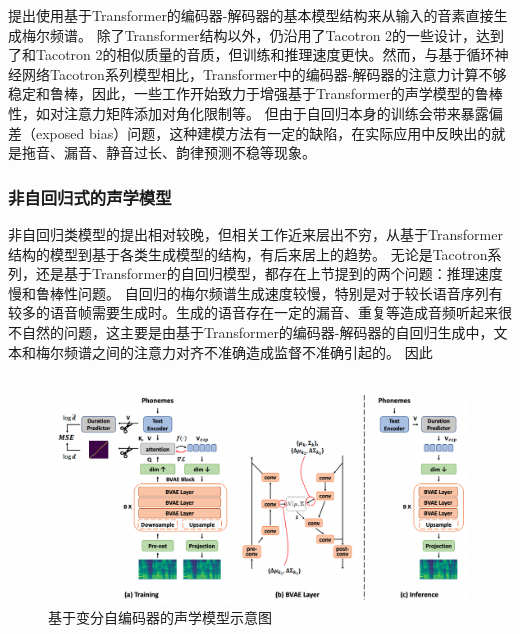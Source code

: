 \citet{transformertts}提出使用基于Transformer的编码器-解码器的基本模型结构来从输入的音素直接生成梅尔频谱。
\citet{transformertts}除了Transformer结构以外，仍沿用了Tacotron 2的一些设计，达到了和Tacotron 2的相似质量的音质，但训练和推理速度更快。然而，与基于循环神经网络Tacotron系列模型相比，Transformer中的编码器-解码器的注意力计算不够稳定和鲁棒，因此，一些工作开始致力于增强基于Transformer的声学模型的鲁棒性，如对注意力矩阵添加对角化限制\citep{robutrans}等。
但由于自回归本身的训练会带来暴露偏差（exposed bias）问题，这种建模方法有一定的缺陷，在实际应用中反映出的就是拖音、漏音、静音过长、韵律预测不稳等现象。
\subsubsection{非自回归式的声学模型}
非自回归类模型的提出相对较晚，但相关工作近来层出不穷，从基于Transformer结构的模型到基于各类生成模型的结构，有后来居上的趋势。
无论是Tacotron系列，还是基于Transformer的自回归模型，都存在上节提到的两个问题：推理速度慢和鲁棒性问题。
自回归的梅尔频谱生成速度较慢，特别是对于较长语音序列有较多的语音帧需要生成时。生成的语音存在一定的漏音、重复等造成音频听起来很不自然的问题，这主要是由基于Transformer的编码器-解码器的自回归生成中，文本和梅尔频谱之间的注意力对齐不准确造成监督不准确引起的。
因此\citet{ren2019fastspeech}
\begin{figure}[htbp]
  \includegraphics[width=0.99\textwidth]{figure/related/bvaetts.png}
  \caption{基于变分自编码器的声学模型示意图}
\end{figure}

